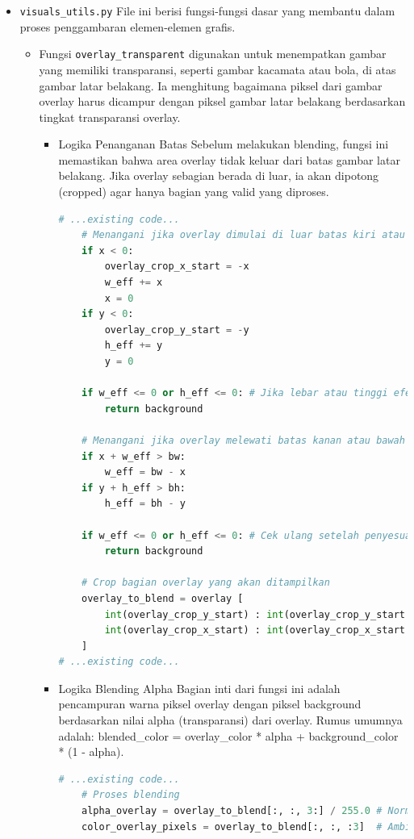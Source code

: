 \documentclass[11pt,a4paper]{article}
\begin{document}
\begin{itemize}
\item \texttt{visuals\_utils.py}
\newline File ini berisi fungsi-fungsi dasar yang membantu dalam proses penggambaran elemen-elemen grafis.
\begin{itemize}
\item Fungsi \texttt{overlay\_transparent} digunakan untuk menempatkan gambar yang memiliki transparansi, seperti gambar kacamata atau bola, di atas gambar latar belakang. Ia menghitung bagaimana piksel dari gambar overlay harus dicampur dengan piksel gambar latar belakang berdasarkan tingkat transparansi overlay.
\begin{itemize}
\item Logika Penanganan Batas
\newline Sebelum melakukan blending, fungsi ini memastikan bahwa area overlay tidak keluar dari batas gambar latar belakang. Jika overlay sebagian berada di luar, ia akan dipotong (cropped) agar hanya bagian yang valid yang diproses.
\begin{lstlisting}[language=Python, caption= Logika penanganan batas]
# ...existing code...
    # Menangani jika overlay dimulai di luar batas kiri atau atas background
    if x < 0: 
        overlay_crop_x_start = -x 
        w_eff += x 
        x = 0
    if y < 0: 
        overlay_crop_y_start = -y 
        h_eff += y 
        y = 0

    if w_eff <= 0 or h_eff <= 0: # Jika lebar atau tinggi efektif menjadi nol atau negatif
        return background
    
    # Menangani jika overlay melewati batas kanan atau bawah background
    if x + w_eff > bw:
        w_eff = bw - x
    if y + h_eff > bh:
        h_eff = bh - y
        
    if w_eff <= 0 or h_eff <= 0: # Cek ulang setelah penyesuaian batas
        return background

    # Crop bagian overlay yang akan ditampilkan
    overlay_to_blend = overlay [
        int(overlay_crop_y_start) : int(overlay_crop_y_start + h_eff),
        int(overlay_crop_x_start) : int(overlay_crop_x_start + w_eff)
    ]
# ...existing code...
\end{lstlisting}
\item Logika Blending Alpha
\newline Bagian inti dari fungsi ini adalah pencampuran warna piksel overlay dengan piksel background berdasarkan nilai alpha (transparansi) dari overlay. Rumus umumnya adalah: blended\_color = overlay\_color * alpha + background\_color * (1 - alpha).
\begin{lstlisting}[language=Python, caption=Logika blending alpha]
# ...existing code...
    # Proses blending
    alpha_overlay = overlay_to_blend[:, :, 3:] / 255.0 # Normalisasi alpha channel overlay
    color_overlay_pixels = overlay_to_blend[:, :, :3]  # Ambil channel warna (RGB) overlay
    

\end{lstlisting}
\end{itemize}
\end{itemize}
\end{itemize}
\end{document}
